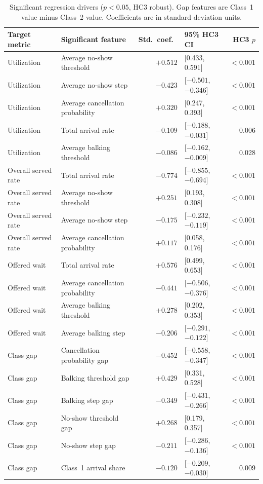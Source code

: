 \documentclass[11pt]{article}
\begin{document}
\begin{table}[H]
\centering
\small
\renewcommand{\arraystretch}{1.08}
\begin{tabular}{p{}p{}rp{}r}
\toprule
Target metric & Significant feature & Std.\ coef.\ & 95\% HC3 CI & HC3 $p$ \\
\midrule
Utilization & Average no-show threshold & $+0.512$ & [0.433, 0.591] & $<0.001$ \\
Utilization & Average no-show step & $-0.423$ & [$-0.501$, $-0.346$] & $<0.001$ \\
Utilization & Average cancellation probability & $+0.320$ & [0.247, 0.393] & $<0.001$ \\
Utilization & Total arrival rate & $-0.109$ & [$-0.188$, $-0.031$] & 0.006 \\
Utilization & Average balking threshold & $-0.086$ & [$-0.162$, $-0.009$] & 0.028 \\
\midrule
Overall served rate & Total arrival rate & $-0.774$ & [$-0.855$, $-0.694$] & $<0.001$ \\
Overall served rate & Average no-show threshold & $+0.251$ & [0.193, 0.308] & $<0.001$ \\
Overall served rate & Average no-show step & $-0.175$ & [$-0.232$, $-0.119$] & $<0.001$ \\
Overall served rate & Average cancellation probability & $+0.117$ & [0.058, 0.176] & $<0.001$ \\
\midrule
Offered wait & Total arrival rate & $+0.576$ & [0.499, 0.653] & $<0.001$ \\
Offered wait & Average cancellation probability & $-0.441$ & [$-0.506$, $-0.376$] & $<0.001$ \\
Offered wait & Average balking threshold & $+0.278$ & [0.202, 0.353] & $<0.001$ \\
Offered wait & Average balking step & $-0.206$ & [$-0.291$, $-0.122$] & $<0.001$ \\
\midrule
Class gap & Cancellation probability gap & $-0.452$ & [$-0.558$, $-0.347$] & $<0.001$ \\
Class gap & Balking threshold gap & $+0.429$ & [0.331, 0.528] & $<0.001$ \\
Class gap & Balking step gap & $-0.349$ & [$-0.431$, $-0.266$] & $<0.001$ \\
Class gap & No-show threshold gap & $+0.268$ & [0.179, 0.357] & $<0.001$ \\
Class gap & No-show step gap & $-0.211$ & [$-0.286$, $-0.136$] & $<0.001$ \\
Class gap & Class~1 arrival share & $-0.120$ & [$-0.209$, $-0.030$] & 0.009 \\
\bottomrule
\end{tabular}
\caption{Significant regression drivers ($p < 0.05$, HC3 robust). Gap
features are Class~1 value minus Class~2 value. Coefficients are in
standard deviation units.}
\label{tab:regression}
\end{table}
\end{document}
